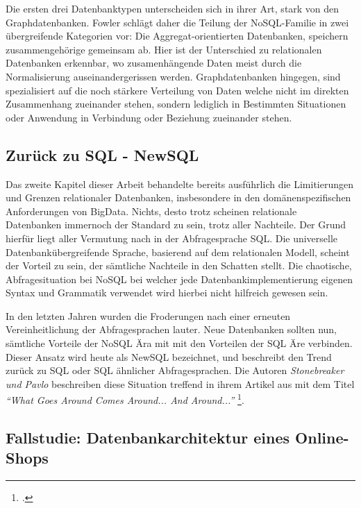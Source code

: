 Die ersten drei Datenbanktypen unterscheiden sich in ihrer Art, stark von den Graphdatenbanken. Fowler schlägt daher die Teilung der NoSQL-Familie  in zwei übergreifende Kategorien vor: Die Aggregat-orientierten Datenbanken, speichern zusammengehörige gemeinsam ab. Hier ist der Unterschied zu relationalen Datenbanken erkennbar, wo zusamenhängende Daten meist durch die Normalisierung auseinandergerissen werden. Graphdatenbanken hingegen, sind spezialisiert auf die noch stärkere Verteilung von Daten welche nicht im direkten Zusammenhang zueinander stehen, sondern lediglich in Bestimmten Situationen oder Anwendung in Verbindung oder Beziehung zueinander stehen.

\subsection{Zurück zu SQL - NewSQL}

Das zweite Kapitel dieser Arbeit behandelte bereits ausführlich die Limitierungen und Grenzen relationaler Datenbanken, insbesondere in den domänenspezifischen Anforderungen von BigData. Nichts, desto trotz scheinen relationale Datenbanken immernoch der Standard zu sein, trotz aller Nachteile. Der Grund hierfür liegt aller Vermutung nach in der Abfragesprache SQL. Die universelle Datenbankübergreifende Sprache, basierend auf dem relationalen Modell, scheint der Vorteil zu sein, der sämtliche Nachteile in den Schatten stellt. Die chaotische, Abfragesituation bei NoSQL bei welcher jede Datenbankimplementierung eigenen Syntax und Grammatik verwendet wird hierbei nicht hilfreich gewesen sein. 

In den letzten Jahren wurden die Froderungen nach einer erneuten Vereinheitlichung der Abfragesprachen lauter. Neue Datenbanken sollten nun, sämtliche Vorteile der NoSQL Ära mit mit den Vorteilen der SQL Äre verbinden. Dieser Ansatz wird heute als NewSQL bezeichnet, und beschreibt den Trend zurück zu SQL oder SQL ähnlicher Abfragesprachen. Die Autoren \textit{Stonebreaker und Pavlo} beschreiben diese Situation treffend in ihrem Artikel aus mit dem Titel \textit{\enquote{What Goes Around Comes Around... And Around...}} \footcite{stonebrakerWhatGoesComes2024}.

\newpage

\subsection{Fallstudie: Datenbankarchitektur eines Online-Shops}

